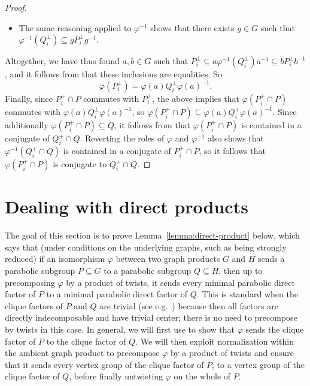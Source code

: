 \documentclass[a4paper,english,11pt]{article}
\theoremstyle{definition}
\theoremstyle{remark}
\begin{document}
\begin{proof}
\begin{itemize}
\begin{itemize}
    \item and $\langle \varphi(P_i),\varphi(G_u)\rangle$ is not cyclic.
\end{itemize}
It follows that the projection of $\varphi(P_i^\perp)$ to $R$ is trivial. Hence $\varphi(P_i^\perp)\subseteq R^\perp\subseteq hQ_i^\perp h^{-1}$.
 \item The same reasoning applied to $\varphi^{-1}$ shows that there exists $g\in G$ such that $\varphi^{-1}(Q_i^\perp)\subseteq g P_i^\perp g^{-1}$. 
\end{itemize} 
Altogether, we have thus found $a,b\in G$ such that $P_i^\perp\subseteq a\varphi^{-1}(Q_i^\perp) a^{-1}\subseteq b P_i^\perp b^{-1}$, and it follows from \cite[Lemma~3.9]{AM} that these inclusions are equalities. So 
\begin{equation*}
    \varphi\left(P_i^\perp\right)=\varphi(a)Q_i^\perp\varphi(a)^{-1}.
\end{equation*}
Finally, since $P_i^+\cap P$ commutes with $P_i^\perp$, the above implies that $\varphi(P_i^+\cap P)$ commutes with $\varphi(a)Q_i^{\perp}\varphi(a)^{-1}$, so $\varphi(P_i^+\cap P)\subseteq \varphi(a)Q_i^+\varphi(a)^{-1}$. Since additionally $\varphi(P_i^+\cap P)\subseteq Q$, it follows from \cite[Proposition~3.4]{AM} that $\varphi(P_i^+\cap P)$ is contained in a conjugate of $Q_i^+\cap Q$. Reverting the roles of $\varphi$ and $\varphi^{-1}$ also shows that $\varphi^{-1}(Q_i^+\cap Q)$ is contained in a conjugate of $P_i^+\cap P$, so it follows that $\varphi(P_i^+\cap P)$ is conjugate to $Q_i^+\cap Q$. 
\end{proof}


\section{Dealing with direct products}\label{sec:direct-products}

The goal of this section is to prove Lemma~\ref{lemma:direct-product} below, which says that (under conditions on the underlying graphs, such as being strongly reduced) if an isomorphism $\varphi$ between two graph products $G$ and $H$ sends a parabolic subgroup $P\subseteq G$ to a parabolic subgroup $Q\subseteq H$, then up to precomposing $\varphi$ by a product of twists, it sends every minimal parabolic direct factor of $P$ to a minimal parabolic direct factor of $Q$. This is standard when the clique factors of $P$ and $Q$ are trivial (see e.g.\ \cite[Lemma~3.5]{Fio}) because then all factors are directly indecomposable and have trivial center; there is no need to precompose by twists in this case. In general, we will first use \cite[Appendix~A]{EH} to show that $\varphi$ sends the clique factor of $P$ to the clique factor of $Q$. We will then exploit normalization within the ambient graph product to precompose $\varphi$ by a product of twists and ensure that it sends every vertex group of the clique factor of $P$, to a vertex group of the clique factor of $Q$, before finally untwisting $\varphi$ on the whole of $P$. 
\end{document}
